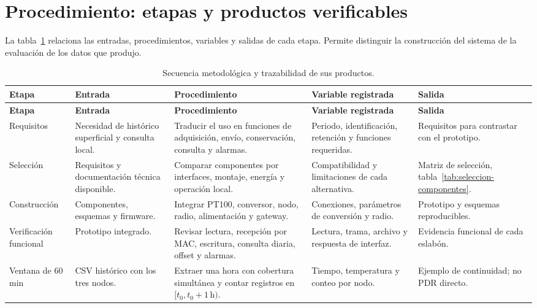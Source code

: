\section{Procedimiento: etapas y productos verificables}
La tabla~\ref{tab:metodo-etapas} relaciona las entradas, procedimientos, variables y salidas de cada etapa. Permite distinguir la construcción del sistema de la evaluación de los datos que produjo.

\begingroup
\small\singlespacing
\setlength{\tabcolsep}{3pt}
\begin{longtable}{@{}>{\raggedright\arraybackslash}p{2.05cm}>{\raggedright\arraybackslash}p{2.65cm}>{\raggedright\arraybackslash}p{4.0cm}>{\raggedright\arraybackslash}p{2.8cm}>{\raggedright\arraybackslash}p{3.1cm}@{}}
\caption{Secuencia metodológica y trazabilidad de sus productos.}\label{tab:metodo-etapas}\\
\toprule
\textbf{Etapa} & \textbf{Entrada} & \textbf{Procedimiento} & \textbf{Variable registrada} & \textbf{Salida} \\
\midrule\endfirsthead
\toprule
\textbf{Etapa} & \textbf{Entrada} & \textbf{Procedimiento} & \textbf{Variable registrada} & \textbf{Salida} \\
\midrule\endhead
\bottomrule\endfoot
Requisitos & Necesidad de histórico superficial y consulta local. & Traducir el uso en funciones de adquisición, envío, conservación, consulta y alarmas. & Periodo, identificación, retención y funciones requeridas. & Requisitos para contrastar con el prototipo. \\
Selección & Requisitos y documentación técnica disponible. & Comparar componentes por interfaces, montaje, energía y operación local. & Compatibilidad y limitaciones de cada alternativa. & Matriz de selección, tabla~\ref{tab:seleccion-componentes}. \\
Construcción & Componentes, esquemas y firmware. & Integrar PT100, conversor, nodo, radio, alimentación y gateway. & Conexiones, parámetros de conversión y radio. & Prototipo y esquemas reproducibles. \\
Verificación funcional & Prototipo integrado. & Revisar lectura, recepción por MAC, escritura, consulta diaria, offset y alarmas. & Lectura, trama, archivo y respuesta de interfaz. & Evidencia funcional de cada eslabón. \\
Ventana de 60 min & CSV histórico con los tres nodos. & Extraer una hora con cobertura simultánea y contar registros en $[t_0,t_0+1\,\mathrm{h})$. & Tiempo, temperatura y conteo por nodo. & Ejemplo de continuidad; no PDR directo. \\

\end{longtable}
